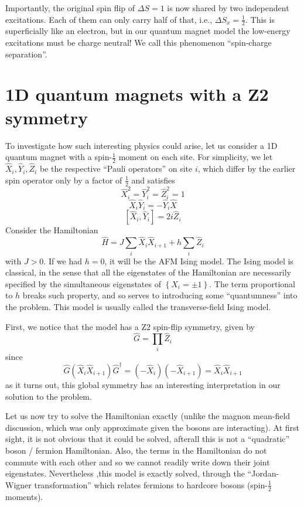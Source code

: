 Importantly, the original spin flip of $\Delta S=1$ is now shared by two independent excitations. Each of them can only carry half of that, i.e., $\Delta S_x=\frac{1}{2}$. This is superficially like an electron, but in our quantum magnet model the low-energy excitations must be charge neutral! We call this phenomenon ``spin-charge separation''.

\section{1D quantum magnets with a Z2 symmetry}

To investigate how such interesting physics could arise, let us consider a 1D quantum magnet with a spin-$\frac{1}{2}$ moment on each site. For simplicity, we let $\hat{X}_i,\hat{Y}_i,\hat{Z}_i$ be the respective ``Pauli operators'' on site $i$, which differ by the earlier spin operator only by a factor of $\frac{1}{2}$ and satisfies
\[ \hat{X}_{i}^{2}=\hat{Y}_{i}^{2}=\hat{Z}_{i}^{2}=1\]
\[ \hat{X}_i\hat{Y}_i=-\hat{Y}_i\hat{X}\]
\[ \left[ \hat{X}_i,\hat{Y}_i \right] =2i\hat{Z}_i\]
Consider the Hamiltonian
\[ \hat{H}=J\sum_i{\hat{X}_i\hat{X}_{i+1}}+h\sum_i{\hat{Z}_i}\]
with $J>0$. If we had $h=0$, it will be the AFM Ising model. The Ising model is classical, in the sense that all the eigenstates of the Hamiltonian are necessarily specified by the simultaneous eigenstates of $\left\{ X_i=\pm 1 \right\}$. The term proportional to $h$ breaks such property, and so serves to introducing some ``quantumness'' into the problem. This model is usually called the transverse-field Ising model.

First, we notice that the model has a Z2 spin-flip symmetry, given by
\[ \hat{G}=\prod_i{\hat{Z}_i}\]
since
\[ \hat{G}\left( \hat{X}_i\hat{X}_{i+1} \right) \hat{G}^{\dagger}=\left( -\hat{X}_i \right) \left( -\hat{X}_{i+1} \right) =\hat{X}_i\hat{X}_{i+1}\]
as it turns out, this global symmetry has an interesting interpretation in our solution to the problem.

Let us now try to solve the Hamiltonian exactly (unlike the magnon mean-field discussion, which was only approximate given the bosons are interacting). At first sight, it is not obvious that it could be solved, afterall this is not a ``quadratic'' boson / fermion Hamiltonian. Also, the terms in the Hamiltonian do not commute with each other and so we cannot readily write down their joint eigenstates. Nevertheless ,this model is exactly solved, through the ``Jordan-Wigner transformation'' which relates fermions to hardcore bosons (spin-$\frac{1}{2}$ moments).

